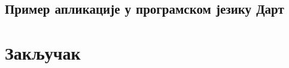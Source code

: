 \documentclass[12pt,oneside]{memoir}
\begin{document}
\section{Пример апликације у програмском језику Дарт}


\chapter{Закључак}


\literatura

\backmatter


\end{document}
